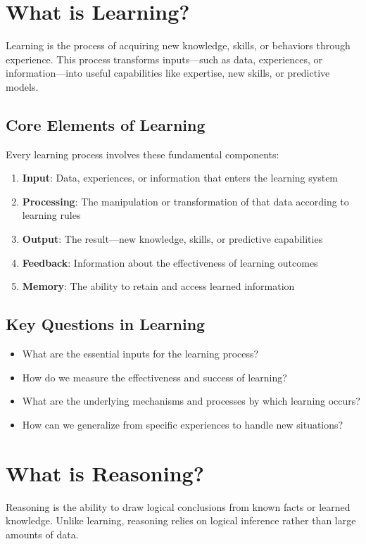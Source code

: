 \section{What is Learning?}
Learning is the process of acquiring new knowledge, skills, or behaviors through experience. This process transforms inputs---such as data, experiences, or information---into useful capabilities like expertise, new skills, or predictive models.

\subsection{Core Elements of Learning}
Every learning process involves these fundamental components:
\begin{enumerate}
    \item \textbf{Input}: Data, experiences, or information that enters the learning system
    \item \textbf{Processing}: The manipulation or transformation of that data according to learning rules
    \item \textbf{Output}: The result---new knowledge, skills, or predictive capabilities
    \item \textbf{Feedback}: Information about the effectiveness of learning outcomes
    \item \textbf{Memory}: The ability to retain and access learned information
\end{enumerate}

\subsection{Key Questions in Learning}
\begin{itemize}
    \item What are the essential inputs for the learning process?
    \item How do we measure the effectiveness and success of learning?
    \item What are the underlying mechanisms and processes by which learning occurs?
    \item How can we generalize from specific experiences to handle new situations?
\end{itemize}

\section{What is Reasoning?}
Reasoning is the ability to draw logical conclusions from known facts or learned knowledge. Unlike learning, reasoning relies on logical inference rather than large amounts of data.

